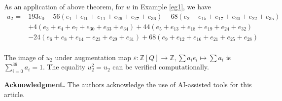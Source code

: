 \documentclass[10pt,twoside,reqno]{amsart}
\theoremstyle{definition}
\numberwithin{equation}{section}
\begin{document}
As an application of above theorem, for $u$ in Example \ref{eg1}, we have 
\begin{align*}
u_2=& 193e_0-56(e_1+e_{10}+e_{11}+e_{26}+e_{27}+e_{36})-68(e_2+e_{15}+e_{17}+e_{20}+e_{22}+e_{35})\\
&+4(e_3+e_4+e_7+e_{30}+e_{33}+e_{34})+44(e_{5}+e_{13}+e_{18}+e_{19}+e_{24}+e_{32})\\
&-24(e_{6}+e_{8}+e_{14}+e_{23}+e_{29}+e_{31})+68(e_{9}+e_{12}+e_{16}+e_{21}+e_{25}+e_{28})\\
\end{align*}

The image of $u_2$ under augmentation map $\varepsilon: \mathbb Z[Q] \rightarrow \mathbb Z, \sum a_ie_i\mapsto \sum a_i$ is $\sum\limits_{i=0}^{36} a_i=1$. The equality $u_2^2=u_2$ can be verified computationally.


\medskip \noindent \textbf{Acknowledgment.}
The authors acknowledge the use of AI-assisted tools for this article.






\printbibliography
\end{document}
